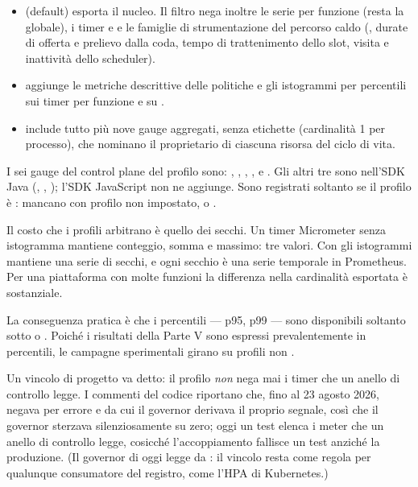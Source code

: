 \begin{itemize}[leftmargin=*]
  \item {} (default) esporta il nucleo. Il filtro nega inoltre le
  serie  per funzione (resta la globale), i timer
   e  e le
  famiglie di strumentazione del percorso caldo (,
  durate di offerta e prelievo dalla coda, tempo di trattenimento dello slot,
  visita e inattivit\`a dello scheduler).
  \item {} aggiunge le metriche descrittive delle politiche e gli
  istogrammi per percentili sui timer per funzione e su
  .
  \item {} include tutto  pi\`u nove gauge aggregati,
  senza etichette (cardinalit\`a 1 per processo), che nominano il proprietario di
  ciascuna risorsa del ciclo di vita.
\end{itemize}

I sei gauge del control plane del profilo  sono:
,
,
,
,  e
. Gli altri tre sono nell'SDK Java
(, ,
); l'SDK JavaScript non ne aggiunge.
Sono registrati soltanto se il profilo \`e : mancano con profilo non
impostato,  o .

Il costo che i profili arbitrano \`e quello dei secchi. Un timer Micrometer
senza istogramma mantiene conteggio, somma e massimo: tre valori. Con gli
istogrammi mantiene una serie di secchi, e ogni secchio \`e una serie temporale
in Prometheus. Per una piattaforma con molte funzioni la differenza nella
cardinalit\`a esportata \`e sostanziale.

La conseguenza pratica \`e che i percentili --- p95, p99 --- sono disponibili
soltanto sotto  o . Poich\'e i risultati della Parte V
sono espressi prevalentemente in percentili, le campagne sperimentali girano su
profili non .

Un vincolo di progetto va detto: il profilo  \emph{non} nega mai i
timer che un anello di controllo legge. I commenti del codice riportano che, fino
al 23 agosto 2026,  negava per errore  e
 da cui il governor derivava il proprio segnale,
cos\`i che il governor sterzava silenziosamente su zero; oggi un test elenca i
meter che un anello di controllo legge, cosicch\'e l'accoppiamento fallisce un
test anzich\'e la produzione. (Il governor di oggi legge da
: il vincolo resta come regola per qualunque
consumatore del registro, come l'HPA di Kubernetes.)

